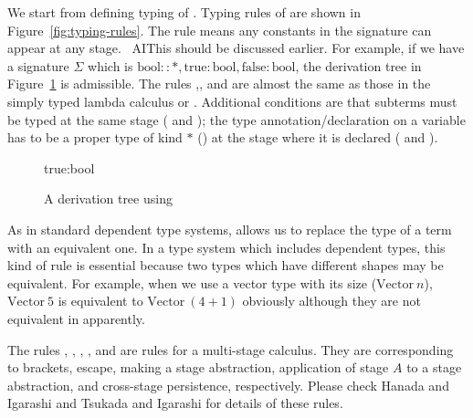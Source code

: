 We start from defining typing of
\LMD.  Typing rules of \LMD are shown in Figure~\ref{fig:typing-rules}.
The rule \TConst{} means any constants in the
signature can appear at any stage.  \
AI{This should be discussed earlier.}  
For example, if we have a signature $\Sigma$ which is
$\textrm{bool} :: *, \textrm{true}: \textrm{bool}, \textrm{false}:
	\textrm{bool}$, the derivation tree in
Figure~\ref{fig:tconst-derivation-tree} is admissible.  
The rules \TVar,\TAbs, and \TApp{} are almost the same as those in the simply typed
lambda calculus or \LLF.  Additional conditions are that subterms must be
typed at the same stage (\TAbs{} and \TApp); the type
annotation/declaration on a variable has to be a proper type of kind
$*$ (\TAbs) at the stage where it is declared (\TVar{} and \TAbs).

\begin{figure}
	\begin{center}
		\begin{minipage}{0.50\hsize}
			{\textrm{true}:\textrm{bool} \in \Sigma \andalso
				 \andalso
			}
			\caption{A derivation tree using \TConst}
			\label{fig:tconst-derivation-tree}
		\end{minipage}
	\end{center}
\end{figure}


{}
As in standard dependent type systems, \TConv{} allows us to replace
the type of a term with an equivalent one.
In a type system which includes dependent types, this kind of rule is essential
because two types which have different shapes may be equivalent.
For example, when we use a vector type with its size ($\textrm{Vector}\ n$),
$\textrm{Vector}\ 5$ is equivalent to $\textrm{Vector}\ (4+1)$ obviously although they are not equivalent in apparently.


The rules \TTB, \TTBL, \TGen, \TIns, and \TCsp{} are rules for a multi-stage calculus.
They are corresponding to brackets, escape, making a stage abstraction,
application of stage $A$ to a stage abstraction, and cross-stage persistence, respectively.
Please check Hanada and Igarashi \cite{Hanada2014} and Tsukada and Igarashi \cite{Tsukada} for details of these rules.


